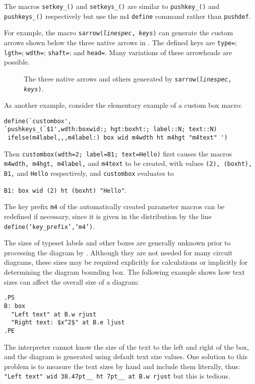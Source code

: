 The macros {\tt setkey\_()} and {\tt setkeys\_()} are similar to
{\tt pushkey\_()} and {\tt pushkeys\_()} respectively but use the
m4 {\tt define} command rather than {\tt pushdef}.

For example, the macro
{\tt sarrow({\sl linespec}, {\sl keys})}
can generate the custom arrows shown below the three native arrows
in .  The defined keys are
 {\tt type=}; {\tt lgth=}; {\tt wdth=}; {\tt shaft=}; and {\tt head=}. 
Many variations of these arrowheads are possible.
\begin{figure}[h!t]
   
   \caption{The three \dpic native arrows and others generated by
    {\tt sarrow({\sl linespec}, {\sl keys})}.}
   \label{arrowex}
   \end{figure}

As another example, consider the elementary example of a custom box macro:

\begin{verbatim}
define(`custombox',
`pushkeys_(`$1',wdth:boxwid:; hgt:boxht:; label::N; text::N)
 ifelse(m4label,,,m4label:) box wid m4wdth ht m4hgt "m4text" ')
\end{verbatim}

Then {\tt custombox(wdth=2; label=B1; text=Hello)}
first causes the macros {\tt m4wdth, m4hgt, m4label,} and {\tt m4text}
to be created, with values {\tt (2), (boxht), B1,} and {\tt Hello}
respectively, and {\tt custombox} evaluates to

{\tt B1:\ box wid (2) ht (boxht) "Hello"}.

The key prefix {\tt m4} of the automatically created parameter macros can be
redefined if necessary, since it is given in the distribution by the line
{\tt define(`key\_prefix',`m4')}.


The sizes of typeset labels and other \tex boxes are generally unknown
prior to processing the diagram by \latex.
Although they are not needed for many circuit diagrams,
these sizes may be required explicitly for calculations or implicitly
for determining the diagram bounding box.  
The following example shows how text sizes can affect the overall size of
a diagram:

\begin{verbatim}
.PS
B: box
  "Left text" at B.w rjust
  "Right text: $x^2$" at B.e ljust
.PE
\end{verbatim}

The \pic interpreter cannot know the size of the text to the left
and right of the box, and the diagram is generated using
default text size values.  One solution to this problem is to measure the
text sizes by hand and include them literally, thus:\hfill\break
\hbox{}\quad%
\verb|"Left text" wid 38.47pt__ ht 7pt__ at B.w rjust|\hfill\break
but this is tedious.

